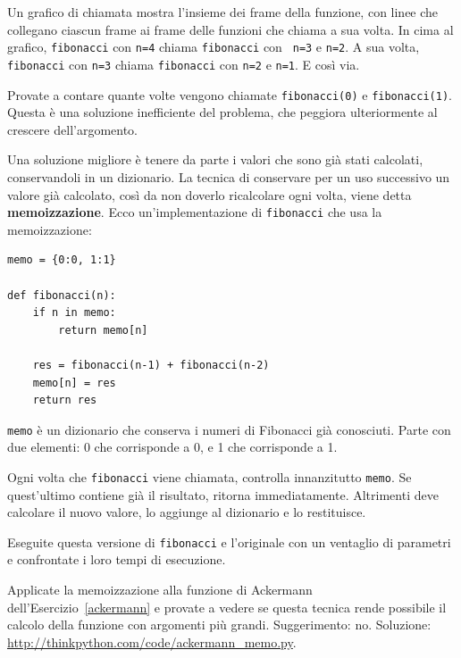 \documentclass[10pt]{book}
\begin{document}
Un grafico di chiamata mostra l'insieme dei frame della funzione, con linee che collegano ciascun frame ai frame delle funzioni che chiama a sua volta. In cima al grafico, {\tt fibonacci} con {\tt n=4} chiama {\tt fibonacci} con {\tt
n=3} e {\tt n=2}.  A sua volta, {\tt fibonacci} con {\tt n=3} chiama
{\tt fibonacci} con {\tt n=2} e {\tt n=1}.  E così via.

Provate a contare quante volte vengono chiamate {\tt fibonacci(0)} e {\tt fibonacci(1)}. Questa è una soluzione inefficiente del problema, che peggiora ulteriormente al crescere dell'argomento.

Una soluzione migliore è tenere da parte i valori che sono già stati calcolati, conservandoli in un dizionario. La tecnica di conservare per un uso successivo un valore già calcolato, così da non doverlo ricalcolare ogni volta, viene detta {\bf memoizzazione}.  Ecco un'implementazione di {\tt fibonacci} che usa la memoizzazione:

\begin{verbatim}
memo = {0:0, 1:1}

def fibonacci(n):
    if n in memo:
        return memo[n]

    res = fibonacci(n-1) + fibonacci(n-2)
    memo[n] = res
    return res
\end{verbatim}
%
{\tt memo} è un dizionario che conserva i numeri di Fibonacci già conosciuti. Parte con due elementi: 0 che corrisponde a 0, e 1 che corrisponde a 1.

Ogni volta che {\tt fibonacci} viene chiamata, controlla innanzitutto {\tt memo}.
Se quest'ultimo contiene già il risultato, ritorna immediatamente. Altrimenti deve calcolare il nuovo valore, lo aggiunge al dizionario e lo restituisce.

\vspace{0.2in}
\begin{exercise}

Eseguite questa versione di {\tt fibonacci} e l'originale con un ventaglio di parametri e confrontate i loro tempi di esecuzione.

\end{exercise}

\vspace{0.2in}
\begin{exercise}

Applicate la memoizzazione alla funzione di Ackermann dell'Esercizio~\ref{ackermann} e provate a vedere se questa tecnica rende possibile il calcolo della funzione con argomenti più grandi. Suggerimento: no.
Soluzione: \url{http://thinkpython.com/code/ackermann_memo.py}.

\end{exercise}
\end{document}
